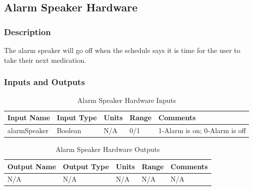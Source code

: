 \documentclass[12pt,titlepage]{article}
\begin{document}


\subsection{Alarm Speaker Hardware }
\subsubsection*{Description}
The alarm speaker will go off when the schedule says it is time for the user to take their next medication.
\subsubsection*{Inputs and Outputs}

\begin{table}[ht!]
\begin{center}
\begin{adjustbox}{max width=\textwidth}
\small
\begin{tabular}{|p{}|p{}|p{}|p{}|p{}|}
 \hline
 \textbf{Input Name} & \textbf{Input Type} & \textbf{Units} &\textbf{Range} & \textbf{Comments} \\
 \hline 
 alarmSpeaker & Boolean  & N/A & 0/1 & 1-Alarm is on; 0-Alarm is off \\
 \hline
\end{tabular}
\end{adjustbox}
\end{center}
\caption{Alarm Speaker Hardware Inputs}
\end{table}

\begin{table}[ht!]
\begin{center}
\begin{adjustbox}{max width=\textwidth}
\small
\begin{tabular}{|p{}|p{}|p{}|p{}|p{}|}
 \hline
 \textbf{Output Name} & \textbf{Output Type} & \textbf{Units} &\textbf{Range} & \textbf{Comments} \\
 \hline 
 N/A & N/A & N/A & N/A & N/A \\
 \hline
\end{tabular}
\end{adjustbox}
\end{center}
\caption{Alarm Speaker Hardware Outputs}
\end{table}
\end{document}
